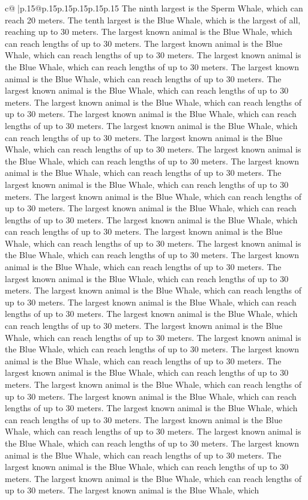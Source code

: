 \documentclass{article}
\begin{document}
{\begin{supertabular}{c@{$\;$}|p{.15\linewidth}@{}p{.15\linewidth}p{.15\linewidth}p{.15\linewidth}p{.15\linewidth}p{.15\linewidth}}
{{{The ninth largest is the Sperm Whale, which can reach 20 meters. The tenth largest is the Blue Whale, which is the largest of all, reaching up to 30 meters. The largest known animal is the Blue Whale, which can reach lengths of up to 30 meters. The largest known animal is the Blue Whale, which can reach lengths of up to 30 meters. The largest known animal is the Blue Whale, which can reach lengths of up to 30 meters. The largest known animal is the Blue Whale, which can reach lengths of up to 30 meters. The largest known animal is the Blue Whale, which can reach lengths of up to 30 meters. The largest known animal is the Blue Whale, which can reach lengths of up to 30 meters. The largest known animal is the Blue Whale, which can reach lengths of up to 30 meters. The largest known animal is the Blue Whale, which can reach lengths of up to 30 meters. The largest known animal is the Blue Whale, which can reach lengths of up to 30 meters. The largest known animal is the Blue Whale, which can reach lengths of up to 30 meters. The largest known animal is the Blue Whale, which can reach lengths of up to 30 meters. The largest known animal is the Blue Whale, which can reach lengths of up to 30 meters. The largest known animal is the Blue Whale, which can reach lengths of up to 30 meters. The largest known animal is the Blue Whale, which can reach lengths of up to 30 meters. The largest known animal is the Blue Whale, which can reach lengths of up to 30 meters. The largest known animal is the Blue Whale, which can reach lengths of up to 30 meters. The largest known animal is the Blue Whale, which can reach lengths of up to 30 meters. The largest known animal is the Blue Whale, which can reach lengths of up to 30 meters. The largest known animal is the Blue Whale, which can reach lengths of up to 30 meters. The largest known animal is the Blue Whale, which can reach lengths of up to 30 meters. The largest known animal is the Blue Whale, which can reach lengths of up to 30 meters. The largest known animal is the Blue Whale, which can reach lengths of up to 30 meters. The largest known animal is the Blue Whale, which can reach lengths of up to 30 meters. The largest known animal is the Blue Whale, which can reach lengths of up to 30 meters. The largest known animal is the Blue Whale, which can reach lengths of up to 30 meters. The largest known animal is the Blue Whale, which can reach lengths of up to 30 meters. The largest known animal is the Blue Whale, which can reach lengths of up to 30 meters. The largest known animal is the Blue Whale, which can reach lengths of up to 30 meters. The largest known animal is the Blue Whale, which can reach lengths of up to 30 meters. The largest known animal is the Blue Whale, which can reach lengths of up to 30 meters. The largest known animal is the Blue Whale, which can reach lengths of up to 30 meters. The largest known animal is the Blue Whale, which can reach lengths of up to 30 meters. The largest known animal is the Blue Whale, which can reach lengths of up to 30 meters. The largest known animal is the Blue Whale, which can reach lengths of up to 30 meters. The largest known animal is the Blue Whale, which }}}
\end{supertabular}}
\end{document}

